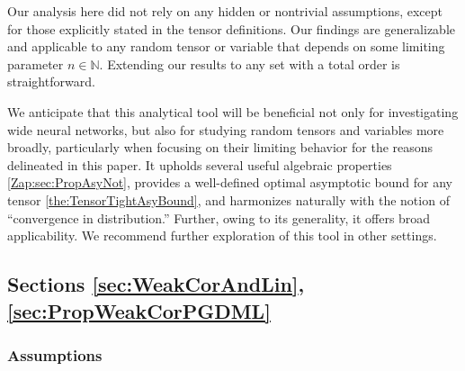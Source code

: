 \documentclass{article} %
\begin{document}
Our analysis here did not rely on any hidden or nontrivial assumptions, except for those explicitly stated in the tensor definitions. Our findings are generalizable and applicable to any random tensor or variable that depends on some limiting parameter \(n\in\mathbb{N}\). Extending our results to any set with a total order is straightforward.

We anticipate that this analytical tool will be beneficial not only for investigating wide neural networks, but also for studying random tensors and variables more broadly, particularly when focusing on their limiting behavior for the reasons delineated in this paper. It upholds several useful algebraic properties \ref{Zap:sec:PropAsyNot}, provides a well-defined optimal asymptotic bound for any tensor \ref{the:TensorTightAsyBound}, and harmonizes naturally with the notion of ``convergence in distribution.'' Further, owing to its generality, it offers broad applicability. We recommend further exploration of this tool in other settings.

\subsection{Sections \ref{sec:WeakCorAndLin}, \ref{sec:PropWeakCorPGDML}}

\subsubsection{Assumptions}
\end{document}
